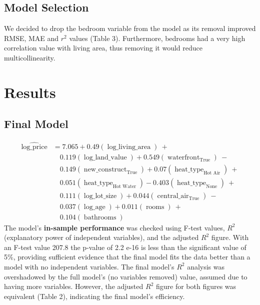 \documentclass[letterpaper,8pt,twocolumn,twoside,]{pinp}
\begin{document}
\subsection{Model Selection}\label{model-selection}

We decided to drop the bedroom variable from the model as its removal
improved RMSE, MAE and \(r^2\) values (Table 3). Furthermore, bedrooms
had a very high correlation value with living area, thus removing it
would reduce multicollinearity.

\section{Results}\label{results}

\subsection{Final Model}\label{final-model}

\begin{equation}
\begin{aligned}
\operatorname{\widehat{log\_price}} &= 7.065 + 0.49(\operatorname{\log\_living\_area})\ + \\
&\quad 0.119(\operatorname{\log\_land\_value}) + 0.549(\operatorname{waterfront}_{\operatorname{True}})\ - \\
&\quad 0.149(\operatorname{new\_construct}_{\operatorname{True}}) + 0.07(\operatorname{heat\_type}_{\operatorname{Hot\ Air}})\ + \\
&\quad 0.051(\operatorname{heat\_type}_{\operatorname{Hot\ Water}}) - 0.403(\operatorname{heat\_type}_{\operatorname{None}})\ + \\
&\quad 0.111(\operatorname{\log\_lot\_size}) + 0.044(\operatorname{central\_air}_{\operatorname{True}})\ - \\
&\quad 0.037(\operatorname{\log\_age}) + 0.011(\operatorname{rooms})\ + \\
&\quad 0.104(\operatorname{bathrooms})
\end{aligned}
\end{equation} The model's \textbf{in-sample performance} was checked
using F-test values, \(R^2\) (explanatory power of independent
variables), and the adjusted \(R^2\) figure. With an F-test value 207.8
the p-value of 2.2 e-16 is less than the significant value of 5\%,
providing sufficient evidence that the final model fits the data better
than a model with no independent variables. The final model's \(R^2\)
analysis was overshadowed by the full model's (no variables removed)
value, assumed due to having more variables. However, the adjusted
\(R^2\) figure for both figures was equivalent (Table 2), indicating the
final model's efficiency.
\end{document}
